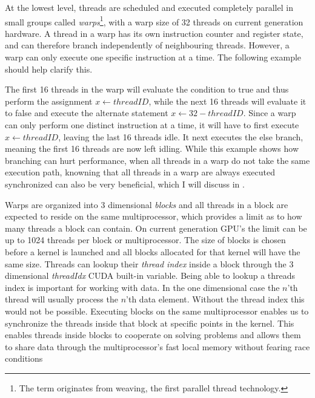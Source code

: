 

At the lowest level, threads are scheduled and executed completely parallel in
small groups called \textit{warps}\footnote{The term originates from weaving,
  the first parallel thread technology.}, with a warp size of 32
threads on current generation hardware. A thread in a warp has its own
instruction counter and register state, and can therefore branch independently
of neighbouring threads. However, a warp can only execute one specific
instruction at a time. The following example should help clarify this.

\begin{algorithmic}
  \ELSE
  \ENDIF
\end{algorithmic}


The first 16 threads in the warp will evaluate the condition to true and thus
perform the assignment $x \leftarrow threadID$, while the next 16 threads will
evaluate it to false and execute the alternate statement $x \leftarrow 32 -
threadID$. Since a warp can only perform one distinct instruction at a time, it
will have to first execute $x \leftarrow threadID$, leaving the last 16 threads
idle. It next executes the else branch, meaning the first 16 threads are now
left idling. While this example shows how branching can hurt performance, when
all threads in a warp do not take the same execution path, knowning that all
threads in a warp are always executed synchronized can also be very beneficial,
which I will discuss in .



Warps are organized into 3 dimensional \textit{blocks} and all threads in a
block are expected to reside on the same multiprocessor, which provides a limit
as to how many threads a block can contain. On current generation GPU's the
limit can be up to 1024 threads per block or multiprocessor. The size of blocks
is chosen before a kernel is launched and all blocks allocated for that kernel
will have the same size. Threads can lookup their \textit{thread index} inside a
block through the 3 dimensional \textit{threadIdx} CUDA built-in variable. Being
able to lookup a threads index is important for working with data. In the one
dimensional case the $n$'th thread will usually process the $n$'th data
element. Without the thread index this would not be possible. Executing blocks
on the same multiprocessor enables us to synchronize the threads inside that
block at specific points in the kernel. This enables threads inside blocks to
cooperate on solving problems and allows them to share data through the
multiprocessor's fast local memory without fearing race conditions

